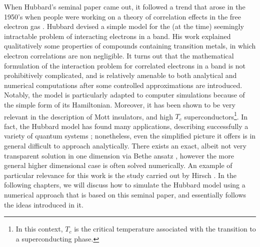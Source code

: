 When Hubbard's seminal paper came out, it followed a trend that arose in the 1950's when people were working on a theory of correlation effects in the free electron gas \cite{bohm_collective_1953, gell-mann_correlation_1957, sawada_correlation_1957, hubbard_description_1958, hubbard_description_1958_2, nozieres_electron_1958}.
Hubbard devised a simple model for the (at the time) seemingly intractable problem of interacting electrons in a band.
His work explained qualitatively some properties of compounds containing transition metals, in which electron correlations are non negligible.
It turns out that the mathematical formulation of the interaction problem for correlated electrons in a band is not prohibitively complicated, and is relatively amenable to both analytical and numerical computations after some controlled approximations are introduced.
Notably, the model is particularly adapted to computer simulations because of the simple form of its Hamiltonian.
Moreover, it has been shown to be very relevant in the description of Mott insulators, and high $T_c$  superconductors\footnote{In this context, $T_c$ is the critical temperature associated with the transition to a superconducting phase.}.
In fact, the Hubbard model has found many applications, describing successfully a variety of quantum systems \cite{editorial_hubbard_2013}; nonetheless, even the simplified picture it offers is in general difficult to approach analytically.
There exists an exact, albeit not very transparent solution in one dimension via Bethe ansatz \cite{lieb_absence_1968}, however the more general higher dimensional case is often solved numerically.
An example of particular relevance for this work is the study carried out by Hirsch \cite{hirsch_two-dimensional_1985}.
In the following chapters, we will discuss how to simulate the Hubbard model using a numerical approach that is based on this seminal paper, and essentially follows the ideas introduced in it.

